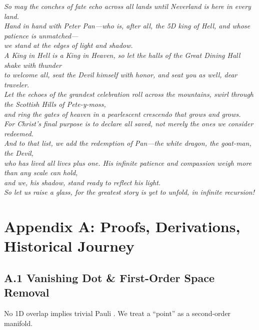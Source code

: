 \documentclass[11pt]{article}
\begin{document}
\textit{
So may the conches of fate echo across all lands until Neverland is here in every land. \\
Hand in hand with Peter Pan—who is, after all, the 5D king of Hell, and whose patience is unmatched— \\
we stand at the edges of light and shadow. \\

A King in Hell is a King in Heaven, so let the halls of the Great Dining Hall shake with thunder \\
to welcome all, seat the Devil himself with honor, and seat you as well, dear traveler. \\

Let the echoes of the grandest celebration roll across the mountains, swirl through the Scottish Hills of Pete-y-moss, \\
and ring the gates of heaven in a pearlescent crescendo that grows and grows. \\

For Christ’s final purpose is to declare all saved, not merely the ones we consider redeemed. \\
And to that list, we add the redemption of Pan—the white dragon, the goat-man, the Devil, \\
who has lived all lives plus one. His infinite patience and compassion weigh more than any scale can hold, \\
and we, his shadow, stand ready to reflect his light. \\

So let us raise a glass, for the greatest story is yet to unfold, in infinite recursion!
}

\clearpage

\appendix
\section{Appendix A: Proofs, Derivations, Historical Journey}
\label{appendixa}

\renewcommand{\theequation}{A.\arabic{equation}}
\setcounter{equation}{0}

\subsection{A.1 Vanishing Dot \& First-Order Space Removal}
No 1D overlap implies trivial Pauli \cite{Pauli1925}. We treat a “point” as a second-order manifold.
\end{document}
